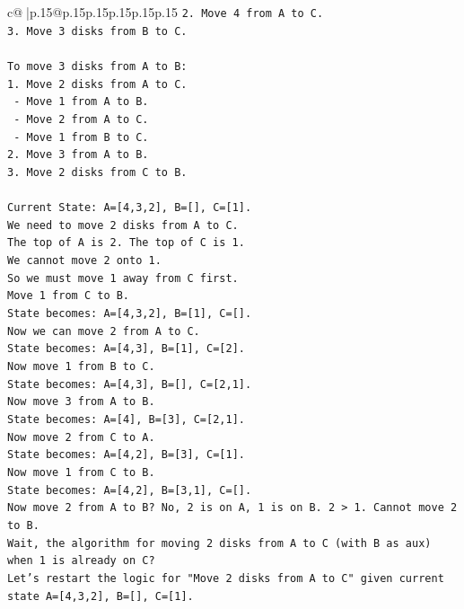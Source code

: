 \documentclass{article}
\begin{document}
{\begin{supertabular}{c@{$\;$}|p{.15\linewidth}@{}p{.15\linewidth}p{.15\linewidth}p{.15\linewidth}p{.15\linewidth}p{.15\linewidth}}
{{{\texttt{2. Move 4 from A to C.} \\
\texttt{3. Move 3 disks from B to C.} \\
\\ 
\texttt{To move 3 disks from A to B:} \\
\texttt{1. Move 2 disks from A to C.} \\
\texttt{   {-} Move 1 from A to B.} \\
\texttt{   {-} Move 2 from A to C.} \\
\texttt{   {-} Move 1 from B to C.} \\
\texttt{2. Move 3 from A to B.} \\
\texttt{3. Move 2 disks from C to B.} \\
\\ 
\texttt{Current State: A={[}4,3,2{]}, B={[}{]}, C={[}1{]}.} \\
\texttt{We need to move 2 disks from A to C.} \\
\texttt{The top of A is 2. The top of C is 1.} \\
\texttt{We cannot move 2 onto 1.} \\
\texttt{So we must move 1 away from C first.} \\
\texttt{Move 1 from C to B.} \\
\texttt{State becomes: A={[}4,3,2{]}, B={[}1{]}, C={[}{]}.} \\
\texttt{Now we can move 2 from A to C.} \\
\texttt{State becomes: A={[}4,3{]}, B={[}1{]}, C={[}2{]}.} \\
\texttt{Now move 1 from B to C.} \\
\texttt{State becomes: A={[}4,3{]}, B={[}{]}, C={[}2,1{]}.} \\
\texttt{Now move 3 from A to B.} \\
\texttt{State becomes: A={[}4{]}, B={[}3{]}, C={[}2,1{]}.} \\
\texttt{Now move 2 from C to A.} \\
\texttt{State becomes: A={[}4,2{]}, B={[}3{]}, C={[}1{]}.} \\
\texttt{Now move 1 from C to B.} \\
\texttt{State becomes: A={[}4,2{]}, B={[}3,1{]}, C={[}{]}.} \\
\texttt{Now move 2 from A to B? No, 2 is on A, 1 is on B. 2 > 1. Cannot move 2 to B.} \\
\texttt{Wait, the algorithm for moving 2 disks from A to C (with B as aux) when 1 is already on C?} \\
\texttt{Let's restart the logic for "Move 2 disks from A to C" given current state A={[}4,3,2{]}, B={[}{]}, C={[}1{]}.} \\
}}}
\end{supertabular}}
\end{document}
